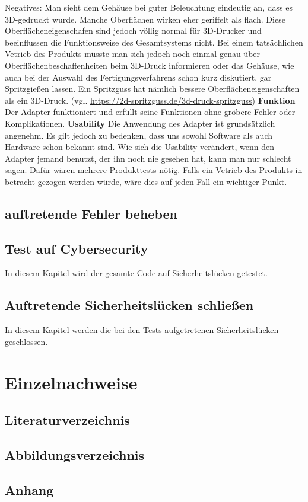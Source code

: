\documentclass[]{article}
\begin{document}
Negatives:\newline
Man sieht dem Gehäuse bei guter Beleuchtung eindeutig an, dass es 3D-gedruckt wurde. Manche Oberflächen wirken eher geriffelt als flach. Diese Oberflächeneigenschafen sind jedoch völlig normal für 3D-Drucker und beeinflussen die Funktionsweise des Gesamtsystems nicht. Bei einem tatsächlichen Vetrieb des Produkts müsste man sich jedoch noch einmal genau über Oberflächenbeschaffenheiten beim 3D-Druck informieren oder das Gehäuse, wie auch bei der Auswahl des Fertigungsverfahrens schon kurz diskutiert, gar Spritzgießen lassen. Ein Spritzguss hat nämlich bessere Oberflächeneigenschaften als ein 3D-Druck.
\vspace{4mm}\newline
(vgl. \url{https://2d-spritzguss.de/3d-druck-spritzguss})
\vspace{4mm}\newline
\textbf{Funktion}\newline
Der Adapter funktioniert und erfüllt seine Funktionen ohne gröbere Fehler oder Komplikationen.
\vspace{4mm}\newline
\textbf{Usability}\newline
Die Anwendung des Adapter ist grundsätzlich angenehm. Es gilt jedoch zu bedenken, dass uns sowohl Software als auch Hardware schon bekannt sind. Wie sich die Usability verändert, wenn den Adapter jemand benutzt, der ihn noch nie gesehen hat, kann man nur schlecht sagen. Dafür wären mehrere Produkttests nötig. Falls ein Vetrieb des Produkts in betracht gezogen werden würde, wäre dies auf jeden Fall ein wichtiger Punkt.
\subsection{auftretende Fehler beheben}
\subsection{Test auf Cybersecurity}
In diesem Kapitel wird der gesamte Code auf Sicherheitslücken getestet.
\subsection{Auftretende Sicherheitslücken schließen}
In diesem Kapitel werden die bei den Tests aufgetretenen Sicherheitslücken geschlossen.

\section{Einzelnachweise}
\subsection{Literaturverzeichnis}
\subsection{Abbildungsverzeichnis}
\subsection{Anhang}
\end{document}

